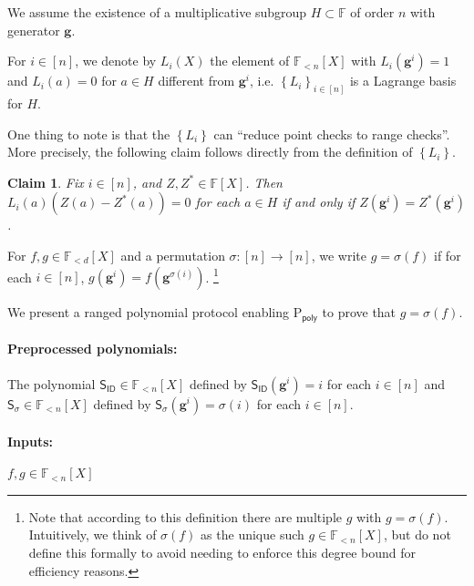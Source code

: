 \documentclass[11pt]{article} %
\newcommand{\F}{\ensuremath{\mathbb F}\xspace}
\newcommand{\sigof}[1]{\ensuremath{\sigma(#1)}\xspace}
\newcommand{\dom}{\ensuremath{H}\xspace}
\newcommand{\sett}[2]{\ensuremath{\set{#1}_{#2}}\xspace}
\newcommand{\prvpoly}{\ensuremath{\mathrm{P_{\mathsf{poly}}}}\xspace}
\newcommand{\set}[1]{\ensuremath{\left\{#1\right\}}\xspace}
\newcommand{\hgen}{\ensuremath{\mathbf{g}}\xspace}
\newcommand{\polysofdeg}[1]{\ensuremath{\F_{< #1}[X]}\xspace}
\newcommand{\sigpoly}{\ensuremath{\mathsf{S_{\sigma}}}\xspace}
\newcommand{\idpoly}{\ensuremath{\mathsf{S_{ID}}}\xspace}
\newtheorem{claim}[lemma]{Claim}
\begin{document}
 
We assume the existence of a multiplicative subgroup $H\subset \F$ of order $n$ with generator \hgen.


For $i\in [n]$, we denote by $L_i(X)$ the element of \polysofdeg{n} with $L_i(\hgen^i)=1$ and $L_i(a)=0$ for $a\in H$ different from  $\hgen^i$, i.e. \sett{L_i}{i\in [n]} is a Lagrange basis for $H$.

One thing to note is that the \set{L_i} can ``reduce point checks to range checks''.
More precisely, the following claim follows directly from the definition of \set{L_i}.
\begin{claim}\label{clm:pointcheck}
 Fix $i\in [n]$, and $Z,Z^*\in \F[X]$. Then $L_i(a) (Z(a)-Z^*(a)) =0$ for each $a\in \dom$ if and only if 
 $Z(\hgen^i) = Z^*(\hgen^i)$.
\end{claim}




For $f,g\in \polysofdeg{d}$ and a permutation $\sigma :[n]\to [n]$,
we write $g=\sigma(f)$ if for each $i\in [n]$, $g(\hgen^i) = f(\hgen^{\sigma(i)})$. \footnote{Note that according to this definition there are multiple $g$ with $g=\sigma(f)$. Intuitively, we think of \sigof{f} as the unique such $g\in \polysofdeg{n}$, but do not define this formally to avoid needing to enforce this degree bound for efficiency reasons.}

We present a ranged polynomial protocol enabling \prvpoly to prove that
$g=\sigof{f}$.

\paragraph{Preprocessed polynomials:}
The polynomial $\idpoly\in \polysofdeg{n}$ defined by 
$\idpoly(\hgen^i) = i$ for each $i\in [n]$ and $\sigpoly \in \polysofdeg{n}$ defined by
$\sigpoly(\hgen^i) = \sigma(i)$ for each $i\in [n]$.
\paragraph{Inputs:}
$f,g\in \polysofdeg{n}$
\end{document}
